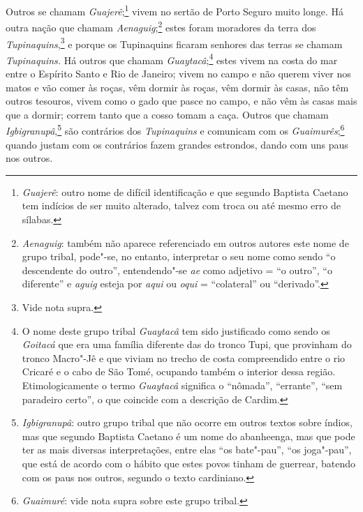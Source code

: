 \begin{linenumbers}
 Outros se chamam \textit{Guajerê};\footnote{ \textit{Guajerê}: outro
nome de difícil identificação e que segundo Baptista Caetano tem
indícios de ser muito alterado, talvez com troca ou até mesmo erro de
sílabas.} vivem no sertão de Porto Seguro muito longe. Há
outra nação que chamam \textit{Aenaguig};\footnote{ \textit{Aenaguig}: 
também não aparece referenciado em outros autores este nome de grupo
tribal, pode"-se, no entanto, interpretar o seu nome como sendo ``o
descendente do outro'', entendendo"-se \textit{ae} como adjetivo = ``o
outro'', ``o diferente'' e \textit{aguig} esteja por \textit{aqui} ou
\textit{oqui} = ``colateral'' ou ``derivado''.} estes foram
moradores da terra dos \textit{Tupinaquins},\footnote{ Vide nota
supra.} e porque os Tupinaquins ficaram senhores das terras se
chamam \textit{Tupinaquins.} Há outros que chamam 
\textit{Guaytacâ};\footnote{ O nome deste grupo tribal \textit{Guaytacâ} tem sido
justificado como sendo os \textit{Goitacá} que era uma família
diferente das do tronco Tupi, que provinham do tronco Macro"-Jê e que
viviam no trecho de costa compreendido entre o rio Cricaré e o cabo de
São Tomé, ocupando também o interior dessa região. Etimologicamente o
termo \textit{Guaytacâ} significa o ``nômada'', ``errante'', ``sem paradeiro
certo'', o que coincide com a descrição de Cardim.} estes vivem
na costa do mar entre o Espírito Santo e Rio de Janeiro; vivem no campo
e não querem viver nos matos e vão comer às roças, vêm dormir às roças,
vêm dormir às casas, não têm outros tesouros, vivem como o gado que
pasce no campo, e não vêm às casas mais que a dormir; correm tanto que
a cosso tomam a caça. Outros que chamam 
\textit{Igbigranupâ},\footnote{ \textit{Igbigranupâ}: 
outro grupo tribal que não ocorre em outros
textos sobre índios, mas que segundo Baptista Caetano é um nome do
abanheenga, mas que pode ter as mais diversas interpretações, entre
elas ``os bate"-pau'', ``os joga"-pau'', que está de acordo com o hábito que
estes povos tinham de guerrear, batendo com os paus nos outros, segundo
o texto cardiniano.} são contrários dos \textit{Tupinaquins} e
comunicam com os \textit{Guaimurês};\footnote{ \textit{Guaimuré}: vide
nota supra sobre este grupo tribal.}  quando justam com os
contrários fazem grandes estrondos, dando com uns paus nos outros.


\end{linenumbers}
